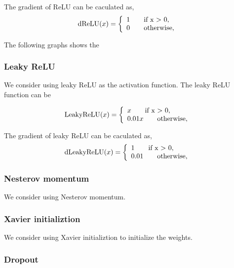 \documentclass{article} %
\begin{document}
The gradient of ReLU can be caculated as,
 \[
\textnormal{dReLU}(x) =\left\{
\begin{array}{ll}
1 \qquad \textnormal{if x $>$ 0,}\\
0 \qquad \textnormal{otherwise,}
\end{array}
\right.
\]



The following graphs shows the 


\subsubsection{Leaky ReLU}

We consider using leaky ReLU as the activation function. The leaky ReLU function can be 

\[
\textnormal{LeakyReLU}(x) =\left\{
\begin{array}{ll}
x \qquad \textnormal{if x $>$ 0,}\\
0.01x \qquad \textnormal{otherwise,}
\end{array}
\right.
\]

The gradient of leaky ReLU can be caculated as,
\[
\textnormal{dLeakyReLU}(x) =\left\{
\begin{array}{ll}
1 \qquad \textnormal{if x $>$ 0,}\\
0.01 \qquad \textnormal{otherwise,}
\end{array}
\right.
\]
\subsubsection{Nesterov momentum}
We consider using Nesterov momentum.

\subsubsection{Xavier initializtion}
We consider using Xavier initializtion to initialize the weights.


\subsubsection{Dropout}
\end{document}
